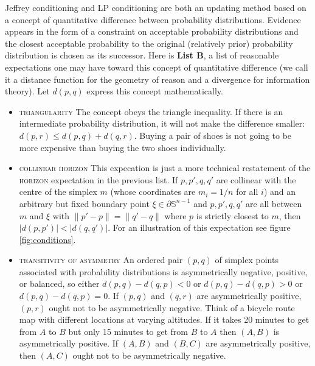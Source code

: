 \documentclass[12pt]{article}
\begin{document}
Jeffrey conditioning and LP conditioning are both an updating method
based on a concept of quantitative difference between probability
distributions. Evidence appears in the form of a constraint on
acceptable probability distributions and the closest acceptable
probability to the original (relatively prior) probability
distribution is chosen as its successor. Here is \textbf{List
  B}\label{page:listtwo}, a list of reasonable expectations one may
have toward this concept of quantitative difference (we call it a
distance function for the geometry of reason and a divergence for
information theory). Let $d(p,q)$ express this concept mathematically.

\begin{itemize}
\item \textsc{triangularity} The concept obeys the triangle
  inequality. If there is an intermediate probability distribution, it
  will not make the difference smaller: $d(p,r)\leq{}d(p,q)+d(q,r)$.
  Buying a pair of shoes is not going to be more expensive than buying
  the two shoes individually.
\item \textsc{collinear horizon} This expecation is just a more
  technical restatement of the \textsc{horizon} expectation in the
  previous list. If $p,p',q,q'$ are collinear with the centre of the
  simplex $m$ (whose coordinates are $m_{i}=1/n$ for all $i$) and an
  arbitrary but fixed boundary point $\xi\in\partial\mathbb{S}^{n-1}$
  and $p,p',q,q'$ are all between $m$ and $\xi$ with
  $\|p'-p\|=\|q'-q\|$ where $p$ is strictly closest to $m$, then
  $|d(p,p')|<|d(q,q')|$. For an illustration of this expectation see
  figure \ref{fig:conditions}. 
\item \textsc{transitivity of asymmetry} An ordered pair $(p,q)$ of
  simplex points associated with probability distributions is
  asymmetrically negative, positive, or balanced, so either
  $d(p,q)-d(q,p)<0$ or $d(p,q)-d(q,p)>0$ or $d(p,q)-d(q,p)=0$. If
  $(p,q)$ and $(q,r)$ are asymmetrically positive, $(p,r)$ ought not
  to be asymmetrically negative. Think of a bicycle route map with
  different locations at varying altitudes. If it takes 20 minutes to
  get from $A$ to $B$ but only 15 minutes to get from $B$ to $A$ then
  $(A,B)$ is asymmetrically positive. If $(A,B)$ and $(B,C)$ are
  asymmetrically positive, then $(A,C)$ ought not to be asymmetrically
  negative.
\end{itemize}
\end{document}
